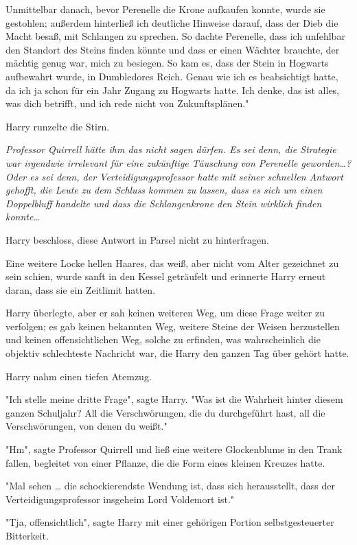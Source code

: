 {Unmittelbar danach, bevor Perenelle die Krone aufkaufen konnte, wurde sie gestohlen; außerdem hinterließ ich deutliche Hinweise darauf, dass der Dieb die Macht besaß, mit Schlangen zu sprechen. So dachte Perenelle, dass ich unfehlbar den Standort des Steins finden könnte und dass er einen Wächter brauchte, der mächtig genug war, mich zu besiegen. So kam es, dass der Stein in Hogwarts aufbewahrt wurde, in Dumbledores Reich. Genau wie ich es beabsichtigt hatte, da ich ja schon für ein Jahr Zugang zu Hogwarts hatte. Ich denke, das ist alles, was dich betrifft, und ich rede nicht von Zukunftsplänen."

Harry runzelte die Stirn.

\emph{Professor Quirrell hätte ihm das nicht sagen dürfen. Es sei denn, die Strategie war irgendwie irrelevant für eine zukünftige Täuschung von Perenelle geworden…? Oder es sei denn, der Verteidigungsprofessor hatte mit seiner schnellen Antwort gehofft, die Leute zu dem Schluss kommen zu lassen, dass es sich um einen Doppelbluff handelte und dass die Schlangenkrone den Stein wirklich finden konnte…}

Harry beschloss, diese Antwort in Parsel nicht zu hinterfragen.

Eine weitere Locke hellen Haares, das weiß, aber nicht vom Alter gezeichnet zu sein schien, wurde sanft in den Kessel geträufelt und erinnerte Harry erneut daran, dass sie ein Zeitlimit hatten.

Harry überlegte, aber er sah keinen weiteren Weg, um diese Frage weiter zu verfolgen; es gab keinen bekannten Weg, weitere Steine der Weisen herzustellen und keinen offensichtlichen Weg, solche zu erfinden, was wahrscheinlich die objektiv schlechteste Nachricht war, die Harry den ganzen Tag über gehört hatte.

Harry nahm einen tiefen Atemzug.

"Ich stelle meine dritte Frage", sagte Harry. "Was ist die Wahrheit hinter diesem ganzen Schuljahr? All die Verschwörungen, die du durchgeführt hast, all die Verschwörungen, von denen du weißt."

"Hm", sagte Professor Quirrell und ließ eine weitere Glockenblume in den Trank fallen, begleitet von einer Pflanze, die die Form eines kleinen Kreuzes hatte.

"Mal sehen … die schockierendste Wendung ist, dass sich herausstellt, dass der Verteidigungsprofessor insgeheim Lord Voldemort ist."

"Tja, offensichtlich", sagte Harry mit einer gehörigen Portion selbstgesteuerter Bitterkeit.

}
